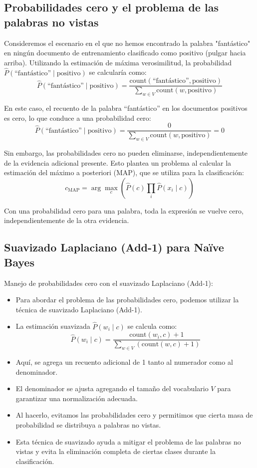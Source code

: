 \subsection{Probabilidades cero y el problema de las palabras no vistas}

Consideremos el escenario en el que no hemos encontrado la palabra "fantástico" en ningún documento de entrenamiento clasificado como positivo (pulgar hacia arriba). Utilizando la estimación de máxima verosimilitud, la probabilidad $\hat{P}(\text{``fantástico''} \mid \text{positivo})$ se calcularía como:
\[
\hat{P}(\text{``fantástico''} \mid \text{positivo}) = \frac{\text{count}(\text{``fantástico''}, \text{positivo})}{\sum_{w \in V} \text{count}(w, \text{positivo})}
\]

En este caso, el recuento de la palabra ``fantástico'' en los documentos positivos es cero, lo que conduce a una probabilidad cero:
\[
\hat{P}(\text{``fantástico''} \mid \text{positivo}) = \frac{0}{\sum_{w \in V} \text{count}(w, \text{positivo})} = 0
\]

Sin embargo, las probabilidades cero no pueden eliminarse, independientemente de la evidencia adicional presente. Esto plantea un problema al calcular la estimación del máximo a posteriori (MAP), que se utiliza para la clasificación:
\[
c_{\text{MAP}} = \arg\max_c \left(\hat{P}(c) \prod_{i} \hat{P}(x_i \mid c)\right)
\]

Con una probabilidad cero para una palabra, toda la expresión se vuelve cero, independientemente de la otra evidencia.

\subsection{Suavizado Laplaciano (Add-1) para Naïve Bayes}

Manejo de probabilidades cero con el suavizado Laplaciano (Add-1):
\begin{itemize}
    \item Para abordar el problema de las probabilidades cero, podemos utilizar la técnica de suavizado Laplaciano (Add-1).
    \item La estimación suavizada $\hat{P}(w_i \mid c)$ se calcula como:
    \[
    \hat{P}(w_i \mid c) = \frac{\text{count}(w_i, c) + 1}{\sum_{w \in V} (\text{count}(w, c) + 1)}
    \]
    \item Aquí, se agrega un recuento adicional de 1 tanto al numerador como al denominador.
    \item El denominador se ajusta agregando el tamaño del vocabulario $V$ para garantizar una normalización adecuada.
    \item Al hacerlo, evitamos las probabilidades cero y permitimos que cierta masa de probabilidad se distribuya a palabras no vistas.
    \item Esta técnica de suavizado ayuda a mitigar el problema de las palabras no vistas y evita la eliminación completa de ciertas clases durante la clasificación.
\end{itemize}

